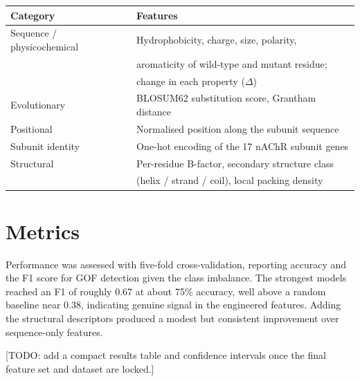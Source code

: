 \documentclass{ws-procs11x85}
\begin{document}
\begin{table}[ht]
{\begin{tabular}{@{}ll@{}}
\toprule
Category & Features \\
\midrule
Sequence / physicochemical &
  Hydrophobicity, charge, size, polarity,\\
  & aromaticity of wild-type and mutant residue;\\
  & change in each property ($\Delta$) \\
Evolutionary &
  BLOSUM62 substitution score, Grantham distance \\
Positional &
  Normalised position along the subunit sequence \\
Subunit identity &
  One-hot encoding of the 17 nAChR subunit genes \\
Structural &
  Per-residue B-factor, secondary structure class\\
  & (helix / strand / coil), local packing density \\
\bottomrule
\end{tabular}}
\label{tab:features}
\end{table}

\section{Metrics}\label{sec:metrics}
Performance was assessed with five-fold cross-validation, reporting
accuracy and the F1 score for GOF detection given the class imbalance.
The strongest models reached an F1 of roughly 0.67 at about 75\% accuracy,
well above a random baseline near 0.38, indicating genuine signal in the
engineered features. Adding the structural descriptors produced a modest
but consistent improvement over sequence-only features.

[TODO: add a compact results table and confidence intervals once the
final feature set and dataset are locked.]

\end{document}
